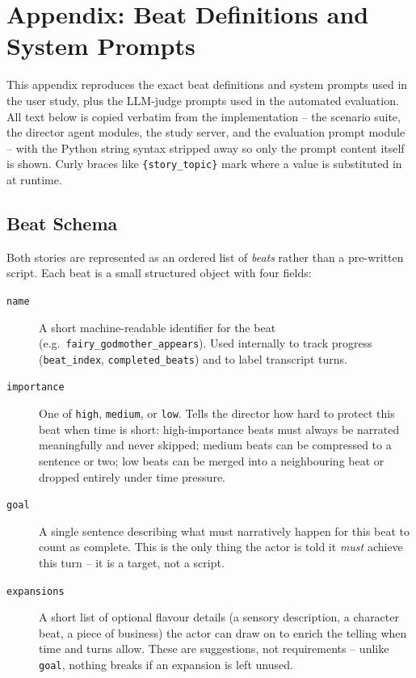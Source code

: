 \documentclass[10pt]{article}
\begin{document}
\section{Appendix: Beat Definitions and System Prompts}
\label{app:prompts-beats}

This appendix reproduces the exact beat definitions and system prompts used
in the user study, plus the LLM-judge prompts used in the automated
evaluation. All text below is copied verbatim from the implementation --
the scenario suite, the director agent modules, the study server, and the
evaluation prompt module -- with the Python string syntax stripped away so
only the prompt content itself is shown. Curly braces like
\texttt{\{story\_topic\}} mark where a value is substituted in at runtime.

\subsection{Beat Schema}
\label{app:beat-schema}

Both stories are represented as an ordered list of \emph{beats} rather than
a pre-written script. Each beat is a small structured object with four
fields:

\begin{description}
\item[\texttt{name}] A short machine-readable identifier for the beat (e.g.\
\texttt{fairy\_godmother\_appears}). Used internally to track progress
(\texttt{beat\_index}, \texttt{completed\_beats}) and to label transcript
turns.
\item[\texttt{importance}] One of \texttt{high}, \texttt{medium}, or
\texttt{low}. Tells the director how hard to protect this beat when time is
short: high-importance beats must always be narrated meaningfully and never
skipped; medium beats can be compressed to a sentence or two; low beats can
be merged into a neighbouring beat or dropped entirely under time pressure.
\item[\texttt{goal}] A single sentence describing what must narratively
happen for this beat to count as complete. This is the only thing the actor
is told it \emph{must} achieve this turn -- it is a target, not a script.
\item[\texttt{expansions}] A short list of optional flavour details (a
sensory description, a character beat, a piece of business) the actor can
draw on to enrich the telling when time and turns allow. These are
suggestions, not requirements -- unlike \texttt{goal}, nothing breaks if an
expansion is left unused.
\end{description}
\end{document}
